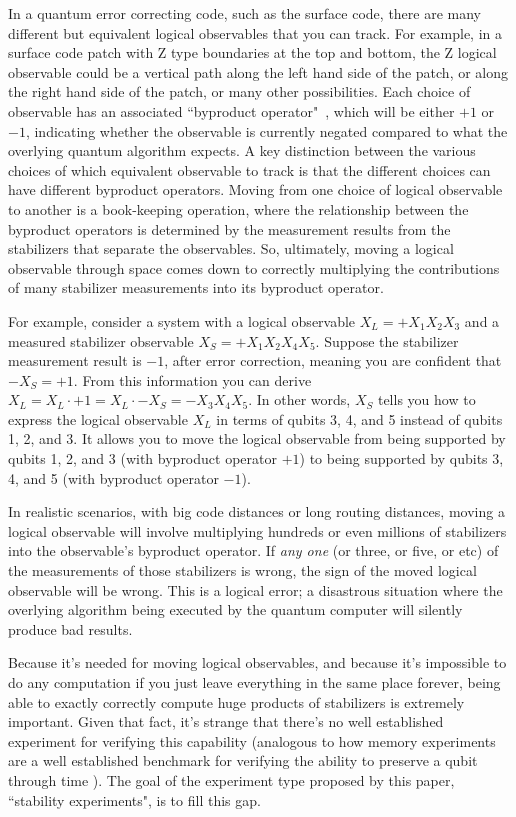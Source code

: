 \documentclass[onecolumn,unpublished,a4paper]{quantumarticle}
\theoremstyle{definition}
\theoremstyle{definition}
\theoremstyle{definition}
\begin{document}
In a quantum error correcting code, such as the surface code, there are many different but equivalent logical observables that you can track.
For example, in a surface code patch with Z type boundaries at the top and bottom, the Z logical observable could be a vertical path along the left hand side of the patch, or along the right hand side of the patch, or many other possibilities.
Each choice of observable has an associated ``byproduct operator"~\cite{fowler2012surfacecodereview}, which will be either $+1$ or $-1$, indicating whether the observable is currently negated compared to what the overlying quantum algorithm expects.
A key distinction between the various choices of which equivalent observable to track is that the different choices can have different byproduct operators.
Moving from one choice of logical observable to another is a book-keeping operation, where the relationship between the byproduct operators is determined by the measurement results from the stabilizers that separate the observables.
So, ultimately, moving a logical observable through space comes down to correctly multiplying the contributions of many stabilizer measurements into its byproduct operator.

For example, consider a system with a logical observable $X_L = +X_1 X_2 X_3$ and a measured stabilizer observable $X_S = +X_1 X_2 X_4 X_5$.
Suppose the stabilizer measurement result is $-1$, after error correction, meaning you are confident that $-X_S = +1$.
From this information you can derive $X_L = X_L \cdot +1 = X_L \cdot -X_S = -X_3X_4 X_5$.
In other words, $X_S$ tells you how to express the logical observable $X_L$ in terms of qubits 3, 4, and 5 instead of qubits 1, 2, and 3.
It allows you to move the logical observable from being supported by qubits 1, 2, and 3 (with byproduct operator $+1$) to being supported by qubits 3, 4, and 5 (with byproduct operator $-1$).

In realistic scenarios, with big code distances or long routing distances, moving a logical observable will involve multiplying hundreds or even millions of stabilizers into the observable's byproduct operator.
If \emph{any one} (or three, or five, or etc) of the measurements of those stabilizers is wrong, the sign of the moved logical observable will be wrong.
This is a logical error; a disastrous situation where the overlying algorithm being executed by the quantum computer will silently produce bad results.

Because it's needed for moving logical observables, and because it's impossible to do any computation if you just leave everything in the same place forever, being able to exactly correctly compute huge products of stabilizers is extremely important.
Given that fact, it's strange that there's no well established experiment for verifying this capability (analogous to how memory experiments are a well established benchmark for verifying the ability to preserve a qubit through time \cite{chen2021exponential,ryan2021realization,zhao2021realizing,krinner2021realizing,andersen2020repeated}).
The goal of the experiment type proposed by this paper, ``stability experiments", is to fill this gap.
\end{document}
